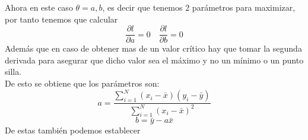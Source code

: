 \documentclass[twocolumn]{article}
\begin{document}
Ahora en este caso $\theta=a,b$, es decir que tenemos 2 parámetros para maximizar, por tanto tenemos que calcular
\[
\frac{\partial l}{\partial a} = 0 \quad \frac{\partial l}{\partial b} = 0 
\]
Además que en caso de obtener mas de un valor crítico hay que tomar la segunda derivada para asegurar que dicho valor sea el máximo y no un mínimo o un punto silla.
\\
De esto se obtiene que los parámetros son: 
\[
a= \frac{\sum_{i=1}^{N}(x_i-\bar{x})(y_i-\bar{y})}{\sum_{i=1}^{N}(x_i-\bar{x})^2}
\]
\[
b =  \bar{y}-a\bar{x}
\]
De estas también podemos establecer






\end{document}
